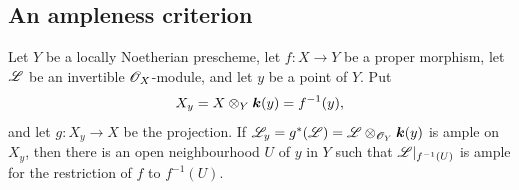 \subsection{An ampleness criterion}
\label{subsection:III.4.7}

\begin{theorem}[4.7.1]
\label{III.4.7.1}
Let $Y$ be a locally Noetherian prescheme, let $f:X\to Y$ be a
proper morphism, let $\mathscr{L}$ be an invertible $\mathscr{O}_X$-module,
and let $y$ be a point of $Y$.  Put
\[
  X_y=X\otimes_Y\boldsymbol{k}(y)=f^{-1}(y),
\]
and let $g:X_y\to X$ be the projection.  If $\mathscr{L}_y=g^*(\mathscr{L})
=\mathscr{L}\otimes_{\mathscr{O}_Y}\boldsymbol{k}(y)$
is ample on $X_y$, then there is an open neighbourhood $U$ of $y$
in $Y$ such that $\mathscr{L}|_{f^{-1}(U)}$ is ample for the restriction
of $f$ to $f^{-1}(U)$.
\end{theorem}

